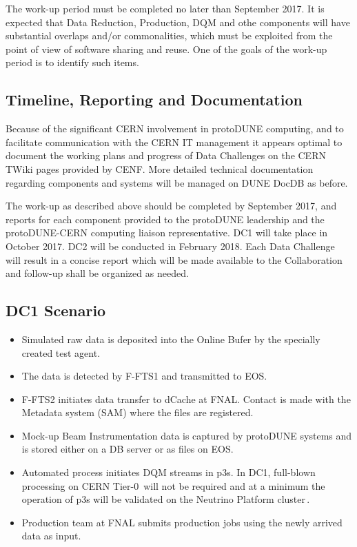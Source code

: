\documentclass[pdftex,12pt,letter]{article}
\newcommand{\pd}{protoDUNE\xspace}
\begin{document}
\noindent The work-up period must be completed no later than September 2017. It is expected that Data Reduction, Production, DQM
and othe components will have substantial overlaps and/or commonalities, which must be exploited from the point of view of software
sharing and reuse. One of the goals of the work-up period is to identify such items.

\subsection{Timeline, Reporting and Documentation}
Because of the significant CERN involvement in \pd computing, and to facilitate communication with the CERN IT management
it appears optimal to document the working plans and progress of Data Challenges on the CERN TWiki pages provided by
CENF. More detailed technical documentation regarding components and systems will be managed on DUNE DocDB as before.

The work-up as described above should be completed by September 2017, and reports for each component provided
to the \pd leadership and the \pd-CERN computing liaison representative. DC1 will take place in October 2017.
DC2 will be conducted in February 2018. Each Data Challenge will result in a concise report which will be made available
to the Collaboration and follow-up shall be organized as needed.

\subsection{DC1 Scenario}

\begin{itemize}

\item Simulated raw data is deposited into the Online Bufer by the specially created test agent.

\item The data is detected by F-FTS1 and transmitted to EOS.

\item F-FTS2 initiates data transfer to dCache at FNAL. Contact is made with the Metadata system (SAM) where the files
are registered.

\item Mock-up Beam Instrumentation data is captured by \pd systems and is stored either on a DB server or as files on EOS.

\item Automated process initiates DQM streams in p3s. In DC1, full-blown processing on CERN Tier-0\,\cite{lxbatch}
will not be required and at a minimum the operation of p3s will be validated on the Neutrino Platform cluster\,\cite{neut}.

\item Production team at FNAL submits production jobs using the newly arrived data as input.

\end{itemize}
\end{document}
